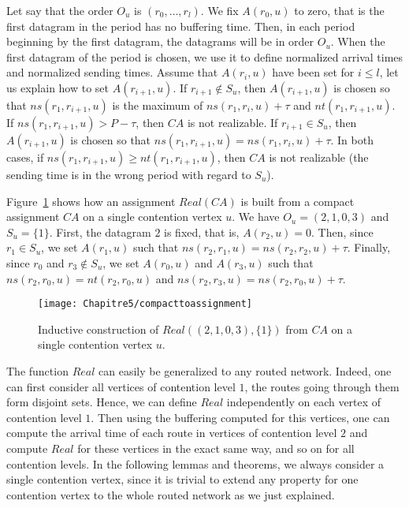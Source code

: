 Let say that the order $O_u$ is $(r_0, \dots, r_l)$. We fix $A(r_0,u)$ to zero, that is the first
datagram in the period has no buffering time. Then, in each period beginning by the first datagram, the datagrams will be in order $O_u$. When the first datagram of the period is chosen, we use it to define normalized arrival times and normalized sending times.
Assume that $A(r_i,u)$ have been set for $i \leq l$, let us explain how to 
set $A(r_{i+1},u)$. If $r_{i+1} \notin S_u$, then $A(r_{i+1},u)$ is chosen so that $ns(r_1,r_{i+1},u)$ is the maximum of $ns(r_1,r_i,u) + \tau$ and $nt(r_1,r_{i+1},u)$. If $ns(r_1,r_{i+1},u) > P - \tau$, then $CA$ is not realizable. If $r_{i+1} \in S_u$, then $A(r_{i+1},u)$ is chosen so that $ns(r_1, r_{i+1},u) = ns(r_1,r_i,u) + \tau$. In both cases, if $ns(r_1, r_{i+1},u) \geq nt(r_1,r_{i+1},u)$, then $CA$ is not realizable (the sending time is in the wrong period with regard to $S_u$). 

Figure~\ref{fig:compacttoassignment} shows how an assignment $Real(CA)$ is built from a compact assignment $CA$ on a single contention vertex $u$. We have $O_u = (2,1,0,3)$ and $S_u = \{1\}$. First, the datagram $2$ is fixed, that is, $A(r_2,u)=0$. Then, since $r_1 \in S_u$, we set $A(r_1,u)$ such that $ ns(r_2,r_1,u) = ns(r_2,r_2,u) + \tau$. 
Finally, since $r_0$ and $r_3 \notin S_u$, we set $A(r_0,u)$ and $A(r_3,u)$ such that $ns(r_2,r_0,u) = nt(r_2,r_0,u)$ and  $ns(r_2,r_3,u) = ns(r_2,r_0,u) + \tau$.
\begin{figure}[!h]
	\centering
	\texttt{[image: Chapitre5/compacttoassignment]}
\caption{Inductive construction of $Real((2,1,0,3),\{1\})$ from $CA$ on a single contention vertex $u$. }
\label{fig:compacttoassignment} 
\end{figure}

The function $Real$ can easily be generalized to any routed network. Indeed, one can first consider all vertices of contention level $1$, the routes going through them form disjoint sets. Hence, we can define $Real$ independently on each vertex of contention level $1$. 
Then using the buffering computed for this vertices, one can compute the arrival time of each route in vertices of contention level $2$ and compute $Real$ for these vertices in the exact same way, and so on for all contention levels. In the following lemmas and theorems, we always consider a single contention vertex, since it is trivial to extend any property for one contention vertex to the whole routed network as we just explained. 

